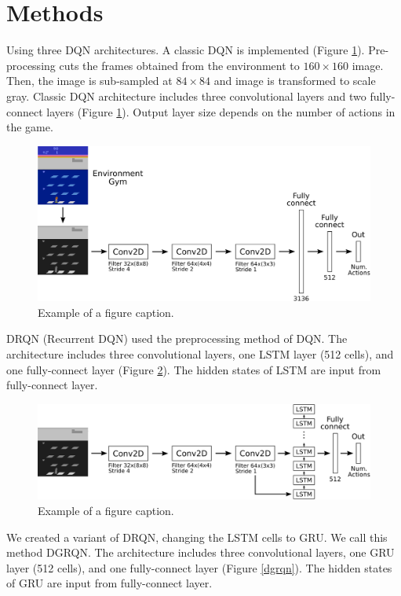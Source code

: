 \documentclass[conference]{IEEEtran}
\begin{document}
\section{Methods}

Using three DQN architectures. A classic DQN is implemented (Figure \ref{dqn}). Pre-processing cuts the frames obtained from the environment to $160\times160$ image. Then, the image is sub-sampled at $84\times84$ and image is transformed to scale gray. Classic DQN architecture includes three convolutional layers and two fully-connect layers (Figure \ref{dqn}). Output layer size depends on the number of actions in the game. 

\begin{figure}[htbp]
\centerline{\includegraphics[width=\linewidth]{images/DQN.png}}
\caption{Example of a figure caption.}
\label{dqn}
\end{figure}

DRQN (Recurrent DQN) used the preprocessing method of DQN. The architecture includes three convolutional layers, one LSTM layer (512 cells), and one fully-connect layer (Figure \ref{drqn}). The hidden states of LSTM are input from fully-connect layer.

\begin{figure}[htbp]
\centerline{\includegraphics[width=\linewidth]{images/DRQN.png}}
\caption{Example of a figure caption.}
\label{drqn}
\end{figure}

We created a variant of DRQN, changing the LSTM cells to GRU. We call this method DGRQN. The architecture includes three convolutional layers, one GRU layer (512 cells), and one fully-connect layer (Figure \ref{dgrqn}). The hidden states of GRU are input from fully-connect layer.
\end{document}
